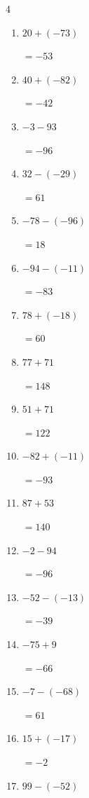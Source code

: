 \begin{multicols}{4}
\begin{enumerate}
        $=92$

  \item $20+(-73)$

        $=-53$

  \item $40+(-82)$

        $=-42$

  \item $-3-93$

        $=-96$

  \item $32-(-29)$

        $=61$

\columnbreak %

  \item $-78-(-96)$

        $=18$

  \item $-94-(-11)$

        $=-83$

  \item $78+(-18)$

        $=60$

  \item $77+71$

        $=148$

  \item $51+71$

        $=122$

  \item $-82+(-11)$

        $=-93$

  \item $87+53$

        $=140$

  \item $-2-94$

        $=-96$

  \item $-52-(-13)$

        $=-39$

  \item $-75+9$

        $=-66$

  \item $-7-(-68)$

        $=61$

  \item $15+(-17)$

        $=-2$

  \item $99-(-52)$


\end{enumerate}
\end{multicols}
